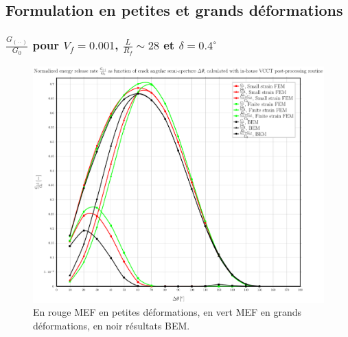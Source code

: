 \documentclass[first,firstsupp,lastsupp,handout,last,hyperref,table]{ETHclass}
\begin{document}
\subsection{Formulation en petites et grands d\'eformations}

\begin{frame}
\frametitle{\small $\frac{G_{\left(\cdot\cdot\right)}}{G_{0}}$ pour $V_{f}=0.001$, $\frac{L}{R_{f}}\sim28$ et $\delta=0.4^{\circ}$}
\vspace{-0.5cm}
\centering
\captionsetup[figure]{font=scriptsize,labelfont=scriptsize}
\begin{figure}[!h]
\centering
\includegraphics[height=0.7\textheight]{2017-06-23_AbqRunSummary_SingleFiberEqRfSmallFiniteStrain_M-VCCT_Summary.pdf}
  \caption{\scriptsize En rouge MEF en petites d\'eformations, en vert MEF en grands d\'eformations, en noir r\'esultats BEM.}
  \label{fig:res1}
\end{figure}
\end{frame}
\end{document}
